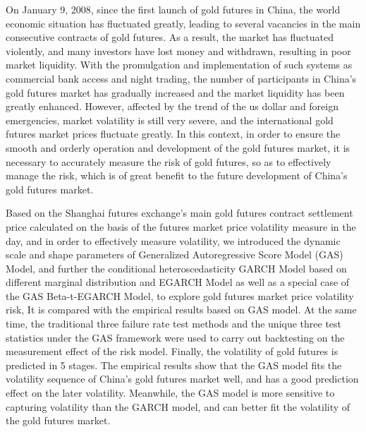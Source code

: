\begin{eabstract}
On January 9, 2008, since the first launch of gold futures in China, the world economic situation 
has fluctuated greatly, leading to several vacancies in the main consecutive contracts of gold 
futures. As a result, the market has fluctuated violently, and many investors have lost money and 
withdrawn, resulting in poor market liquidity. With the promulgation and implementation of such 
systems as commercial bank access and night trading, the number of participants in China's gold 
futures market has gradually increased and the market liquidity has been greatly enhanced. However,
affected by the trend of the us dollar and foreign emergencies, market volatility is still very 
severe, and the international gold futures market prices fluctuate greatly. In this context, in 
order to ensure the smooth and orderly operation and development of the gold futures market, it is 
necessary to accurately measure the risk of gold futures, so as to effectively manage the risk, 
which is of great benefit to the future development of China's gold futures market.

Based on the Shanghai futures exchange's main gold futures contract settlement price calculated on 
the basis of the futures market price volatility measure in the day, and in order to effectively 
measure volatility, we introduced the dynamic scale and shape parameters of Generalized 
Autoregressive Score Model (GAS) Model, and further the conditional heteroscedasticity GARCH Model 
based on different marginal distribution and EGARCH Model as well as a special case of the GAS 
Beta-t-EGARCH Model, to explore gold futures market price volatility risk, It is compared with the 
empirical results based on GAS model. At the same time, the traditional three failure rate test 
methods and the unique three test statistics under the GAS framework were used to carry out 
backtesting on the measurement effect of the risk model. Finally, the volatility of gold futures is
predicted in 5 stages. The empirical results show that the GAS model fits the volatility sequence 
of China's gold futures market well, and has a good prediction effect on the later volatility. 
Meanwhile, the GAS model is more sensitive to capturing volatility than the GARCH model, and can 
better fit the volatility of the gold futures market.


\end{eabstract}
